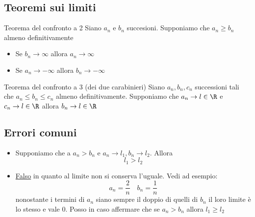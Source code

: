 \subsection{Teoremi sui limiti}
\label{sub:teoremilimiti}
\begin{teorema}{Teorema del confronto a 2}
	Siano $a_n $ e $b_n$ succesioni. Supponiamo che $a_n \ge b_n$ almeno definitivamente
	\begin{itemize}
		\item Se $b_n \to \infty$ allora $a_ n \to \infty$
		\item Se $a_n \to -\infty$ allora $b_n  \to -\infty$
	\end{itemize}
\end{teorema} \label{teoconfrontoadue}

\begin{teorema}{Teorema del confronto a 3 (dei due carabinieri)}
	Siano $a_n, b_n, c_n$ successioni tali che $a_n \le b_n \le c_n$ almeno definitivamente. Supponiamo che $a_n \to l \in  \R$ e $c_n \to l \in  \R$ allora $ b_n \to l \in  \R$
\end{teorema}

\label{teoconfrontoatre}
\subsection{Errori comuni}
\begin{itemize}
	\item Supponiamo che a $a_n > b_n$ e $a_n \to l_1, b_n \to l_2$. Allora \[
		      l_1 > l_2
	      \]
	\item \underline{Falso} in quanto al limite non si conserva l'uguale. Vedi ad esempio:
	      \[
		      a_n = \frac{2}{n} \quad b_n = \frac{1}{n}
	      \]
	      nonostante i termini di $a_n$ siano sempre il doppio di quelli di $ b_n$ il loro limite è lo stesso e vale 0. Posso in caso affermare che se $a_n > b_n$ allora $l_1 \ge l_2$
\end{itemize}

